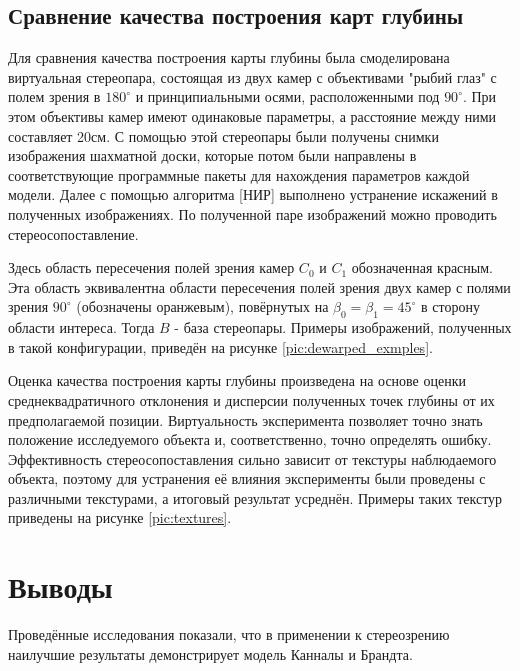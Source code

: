 
\subsection{Сравнение качества построения карт глубины}

Для сравнения качества построения карты глубины была смоделирована виртуальная стереопара, состоящая из двух камер с объективами 
"рыбий глаз" с полем зрения в $180^\circ$ и принципиальными осями, расположенными под $90^\circ$. При этом объективы камер имеют 
одинаковые параметры, а расстояние между ними составляет 20см. С помощью этой стереопары были получены снимки изображения шахматной доски, 
которые потом были направлены в соответствующие программные пакеты для нахождения параметров каждой модели. Далее с помощью алгоритма [НИР]				%
выполнено устранение искажений в полученных изображениях. По полученной паре изображений можно проводить стереосопоставление. 


Здесь область пересечения полей зрения камер $C_0$ и $C_1$ обозначенная красным.
Эта область эквивалентна области пересечения полей зрения двух камер с полями зрения $90^\circ$ (обозначены
оранжевым), повёрнутых на $\beta_0 = \beta_1  = 45^\circ$ в сторону области интереса. Тогда $B$ - база стереопары.
Примеры изображений, полученных в такой конфигурации, приведён на рисунке \ref{pic:dewarped_exmples}. 



Оценка качества построения карты глубины произведена на основе оценки среднеквадратичного отклонения и дисперсии полученных точек 
глубины от их предполагаемой позиции. Виртуальность эксперимента позволяет точно знать положение исследуемого объекта и, соответственно, 
точно определять ошибку. Эффективность стереосопоставления \cite{SGBM} сильно зависит от текстуры наблюдаемого объекта, поэтому для устранения 
её влияния эксперименты были проведены с различными текстурами, а итоговый результат усреднён. Примеры таких текстур приведены на рисунке \ref{pic:textures}. 


\section{Выводы}
\label{conclusion}


Проведённые исследования показали, что в применении к стереозрению наилучшие результаты демонстрирует модель Канналы и Брандта.  

\newpage




